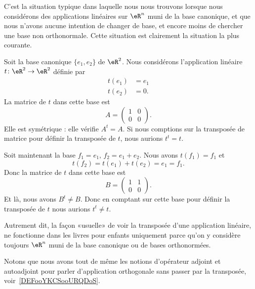 C'est la situation typique dans laquelle nous nous trouvons lorsque nous considérons des applications linéaires sur \( \eR^n\) muni de la base canonique, et que nous n'avons aucune intention de changer de base, et encore moins de chercher une base non orthonormale. Cette situation est clairement la situation la plus courante.

\begin{example}
	Soit la base canonique \( \{ e_1,e_2 \}\) de \( \eR^2\). Nous considérons l'application linéaire \( t\colon \eR^2\to \eR^2\) définie par
	\begin{subequations}
		\begin{align}
			t(e_1) & =e_1 \\
			t(e_2) & =0.
		\end{align}
	\end{subequations}
	La matrice de \( t\) dans cette base est
	\begin{equation}
		A=\begin{pmatrix}
			1 & 0 \\
			0 & 0
		\end{pmatrix}.
	\end{equation}
	Elle est symétrique : elle vérifie \( A^t=A\). Si nous comptions sur la transposée de matrice pour définir la transposée de \( t\), nous aurions \( t^t=t\).

	Soit maintenant la base \( f_1=e_1\), \( f_2=e_1+e_2\). Nous avons \( t(f_1)=f_1\) et
	\begin{equation}
		t(f_2)=t(e_1)+t(e_2)=e_1=f_1.
	\end{equation}
	Donc la matrice de \( t\) dans cette base est
	\begin{equation}
		B=\begin{pmatrix}
			1 & 1 \\
			0 & 0
		\end{pmatrix}.
	\end{equation}
	Et là, nous avons \( B^t\neq B\). Donc en comptant sur cette base pour définir la transposée de \( t\) nous aurions \( t^t\neq t\).
\end{example}

\begin{normaltext}      \label{NooMZVRooExWVKJ}
	Autrement dit, la façon «usuelle» de voir la transposée d'une application linéaire, ne fonctionne dans les livres pour enfants uniquement parce qu'on y considère toujours \( \eR^n\) muni de la base canonique ou de bases orthonormées.

	Notons que nous avons tout de même les notions d'opérateur adjoint et autoadjoint pour parler d'application orthogonale sans passer par la transposée, voir~\ref{DEFooYKCSooURQDoS}.
\end{normaltext}

